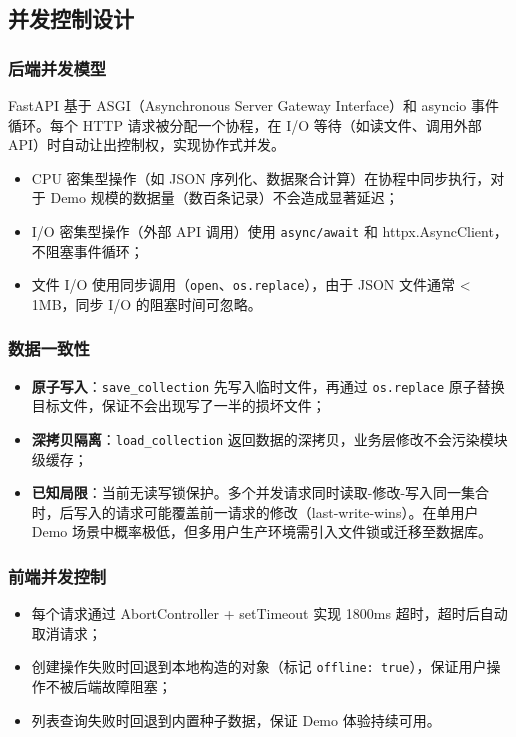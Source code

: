 \documentclass[12pt,a4paper]{ctexart}
\begin{document}
\subsection{并发控制设计}

\subsubsection{后端并发模型}

FastAPI 基于 ASGI（Asynchronous Server Gateway Interface）和 asyncio 事件循环。每个 HTTP 请求被分配一个协程，在 I/O 等待（如读文件、调用外部 API）时自动让出控制权，实现协作式并发。

\begin{itemize}
  \item CPU 密集型操作（如 JSON 序列化、数据聚合计算）在协程中同步执行，对于 Demo 规模的数据量（数百条记录）不会造成显著延迟；
  \item I/O 密集型操作（外部 API 调用）使用 \texttt{async/await} 和 httpx.AsyncClient，不阻塞事件循环；
  \item 文件 I/O 使用同步调用（\texttt{open}、\texttt{os.replace}），由于 JSON 文件通常 < 1MB，同步 I/O 的阻塞时间可忽略。
\end{itemize}

\subsubsection{数据一致性}

\begin{itemize}
  \item \textbf{原子写入}：\texttt{save\_collection} 先写入临时文件，再通过 \texttt{os.replace} 原子替换目标文件，保证不会出现写了一半的损坏文件；
  \item \textbf{深拷贝隔离}：\texttt{load\_collection} 返回数据的深拷贝，业务层修改不会污染模块级缓存；
  \item \textbf{已知局限}：当前无读写锁保护。多个并发请求同时读取-修改-写入同一集合时，后写入的请求可能覆盖前一请求的修改（last-write-wins）。在单用户 Demo 场景中概率极低，但多用户生产环境需引入文件锁或迁移至数据库。
\end{itemize}

\subsubsection{前端并发控制}

\begin{itemize}
  \item 每个请求通过 AbortController + setTimeout 实现 1800ms 超时，超时后自动取消请求；
  \item 创建操作失败时回退到本地构造的对象（标记 \texttt{offline: true}），保证用户操作不被后端故障阻塞；
  \item 列表查询失败时回退到内置种子数据，保证 Demo 体验持续可用。
\end{itemize}
\end{document}
